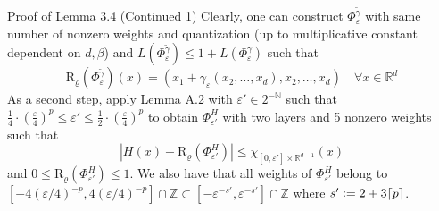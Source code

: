 \documentclass{if-beamer}
\newcommand{\defeq}{\vcentcolon=}
\begin{document}
\begin{frame}{Proof of Lemma 3.4 (Continued 1)}
    Clearly, one can construct $\Phi_{\varepsilon}^{\widetilde{\gamma}}$ with same number of nonzero weights and quantization (up to multiplicative constant dependent on $d, \beta$) and $L(\Phi_{\varepsilon}^{\widetilde{\gamma}}) \leq 1 + L(\Phi_{\varepsilon}^{\gamma})$ such that
    $$ \mathrm{R}_{\varrho}\left(\Phi_{\varepsilon}^{\widetilde{\gamma}} \right)(x) = \left(x_1 + \gamma_{\varepsilon}(x_2,\dots,x_d),x_2,\dots,x_d \right) \quad \forall x \in \mathbb{R}^d $$
    As a second step, apply Lemma A.2 with $\varepsilon' \in 2^{-\mathbb{N}}$ such that $\frac{1}{4}\cdot \left(\frac{\varepsilon}{4} \right)^p \leq \varepsilon' \leq \frac{1}{2}\cdot \left(\frac{\varepsilon}{4} \right)^p$ to obtain $\Phi_{\varepsilon'}^H$ with two layers and 5 nonzero weights such that $$\left|H(x) - \mathrm{R}_{\varrho}\left(\Phi_{\varepsilon'}^H \right)\right| \leq \chi_{[0, \varepsilon'] \times \mathbb{R}^{d-1}}(x) $$ 
    and $0 \leq\mathrm{R}_{\varrho}\left(\Phi_{\varepsilon'}^H \right) \leq 1$. We also have that all weights of $\Phi_{\varepsilon'}^H$ belong to $[-4(\varepsilon/4)^{-p}, 4(\varepsilon/4)^{-p}] \cap \mathbb{Z} \subset [-\varepsilon^{-s'}, \varepsilon^{-s'}] \cap \mathbb{Z}$ where $s' \defeq 2+3\lceil p \rceil$.
\end{frame}
\end{document}
